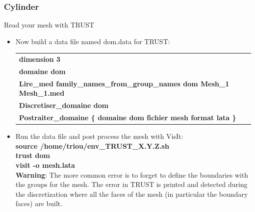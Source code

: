 \documentclass[10pt, hyperref={unicode=true,pdfusetitle, bookmarks=true,bookmarksnumbered=false,bookmarksopen=false, breaklinks=false,pdfborder={0 0 1},backref=true,colorlinks=true,linkcolor=darkblue,pageanchor}]{beamer}
\begin{document}
\begin{frame}
\frametitle{Cylinder}
\begin{block}{Read your mesh with TRUST}

\begin{itemize}
\item \label{read_mesh} Now build a data file named dom.data for TRUST:\\
\vspace{0.2cm}
\begin{tabular}{|l|}
\hline 
\textbf{dimension 3 }\tabularnewline
\textbf{domaine dom }\tabularnewline
\textbf{Lire\_med family\_names\_from\_group\_names dom Mesh\_1 Mesh\_1.med }\tabularnewline
\textbf{Discretiser\_domaine\index{discretiser\_domaine} dom }\tabularnewline
\textbf{Postraiter\_domaine\index{Postraiter\_domaine} \{ domaine dom fichier mesh format lata\index{format lata}
\}}\tabularnewline
\hline 
\end{tabular}

\item Run the data file and post process the mesh with VisIt:\\
\textbf{source  /home/triou/env\_TRUST\_X.Y.Z.sh} \\
\textbf{trust dom} \\
\textbf{visit -o mesh.lata} \\
\vspace{0.2cm}
\textbf{Warning}: The more common error is to forget to define the boundaries with the groups for the mesh. The error in TRUST is printed and detected during the discretization where all the faces of the mesh (in particular the boundary faces) are built.

\end{itemize}

\end{block}
\end{frame}
\end{document}
